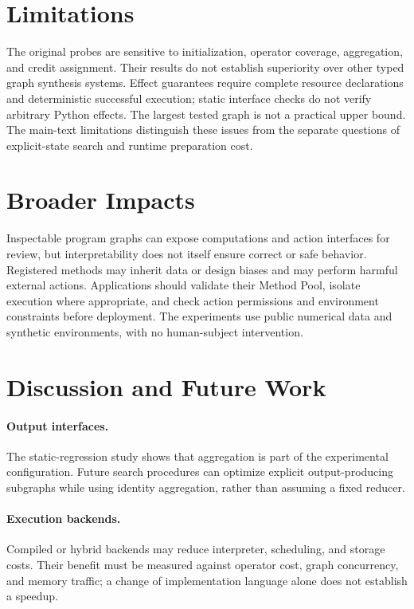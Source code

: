\section{Limitations}
The original probes are sensitive to initialization, operator coverage,
aggregation, and credit assignment. Their results do not establish superiority
over other typed graph synthesis systems. Effect guarantees require complete
resource declarations and deterministic successful execution; static interface
checks do not verify arbitrary Python effects. The largest tested graph is not
a practical upper bound. The main-text limitations distinguish these issues
from the separate questions of explicit-state search and runtime preparation
cost.

\section{Broader Impacts}
\label{app:broader_impacts}
Inspectable program graphs can expose computations and action interfaces for
review, but interpretability does not itself ensure correct or safe behavior.
Registered methods may inherit data or design biases and may perform harmful
external actions. Applications should validate their Method Pool, isolate
execution where appropriate, and check action permissions and environment
constraints before deployment. The experiments use public numerical data and
synthetic environments, with no human-subject intervention.

\section{Discussion and Future Work}
\label{app:discussion_future_work}
\paragraph{Output interfaces.}
\label{subsec:rethinking_collapse}
The static-regression study shows that aggregation is part of the experimental
configuration. Future search procedures can optimize explicit output-producing
subgraphs while using identity aggregation, rather than assuming a fixed reducer.

\paragraph{Execution backends.}
\label{subsec:cpp_migration}
Compiled or hybrid backends may reduce interpreter, scheduling, and storage
costs. Their benefit must be measured against operator cost, graph concurrency,
and memory traffic; a change of implementation language alone does not establish
a speedup.


